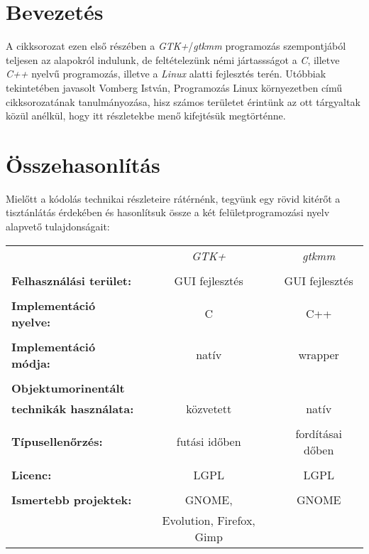 \section{Bevezetés}

A cikksorozat ezen első részében a \textit{GTK+}/\textit{gtkmm} programozás szempontjából teljesen az alapokról indulunk, de feltételezünk némi jártassságot a \textit{C}, illetve \textit{C++} nyelvű programozás, illetve a \textit{Linux} alatti fejlesztés terén. Utóbbiak tekintetében javasolt Vomberg István, Programozás Linux környezetben című cikksorozatának tanulmányozása, hisz számos területet érintünk az ott tárgyaltak közül anélkül, hogy itt részletekbe menő kifejtésük megtörténne.

\section{Összehasonlítás}

Mielőtt a kódolás technikai részleteire rátérnénk, tegyünk egy rövid kitérőt a tisztánlátás érdekében és hasonlítsuk össze a két felületprogramozási nyelv alapvető tulajdonságait:\vspace{16pt}

\begin{tabular}[t]{l c c}
                                       & \textit{GTK+}                     & \textit{gtkmm}   \\\\
\textbf{Felhasználási terület:}        & GUI fejlesztés                    & GUI fejlesztés   \\\\
\textbf{Implementáció nyelve:}         & C                                 & C++              \\\\
\textbf{Implementáció módja:}          & natív                             & wrapper          \\\\
\textbf{Objektumorinentált}            &                                   &                  \\
\textbf{technikák használata:}         & közvetett                         & natív            \\\\
\textbf{Típusellenőrzés:}              & futási időben                     & fordításai dőben \\\\
\textbf{Licenc:}                       & LGPL                              & LGPL             \\\\
\textbf{Ismertebb projektek:}          & GNOME,                            & GNOME            \\
                                       & Evolution, Firefox, Gimp          &                  \\
\end{tabular}


